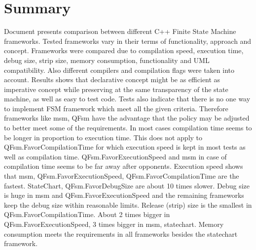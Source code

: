 \chapter{Summary}
Document presents comparison between different C++ Finite State Machine frameworks.
Tested frameworks vary in their terms of functionality, approach and concept.
Frameworks were compared due to compilation speed, execution time, debug size, strip size, memory
consumption, functionality and UML compatibility. Also different compilers and compilation flags were taken into account.
Results shows that declarative concept might be as efficient as imperative concept
while preserving at the same transparency of the state machine, as well as easy to test
code. Tests also indicate that there is no one way to implement FSM framework which meet all the
given criteria. Therefore frameworks like msm, QFsm have the advantage that the policy may be
adjusted to better meet some of the requirements.
In most cases compilation time seems to be longer in proportion to execution time.
This does not apply to QFsm.FavorCompilationTime for which execution speed is kept in most tests as well
as compilation time. QFsm.FavorExecutionSpeed and msm in case of compilation time seems to be far away after opponents.
Execution speed shows that msm, QFsm.FavorExecutionSpeed, QFsm.FavorCompilationTime are the fastest.
StateChart, QFsm.FavorDebugSize are about 10 times slower.
Debug size is huge in msm and QFsm.FavorExecutionSpeed and the remaining frameworks keep the debug size
within reasonable limits. Release (strip) size is the smallest in QFsm.FavorCompilationTime.
About 2 times bigger in QFsm.FavorExecutionSpeed, 3 times bigger in msm, statechart.
Memory consumption meets the requirements in all frameworks besides the statechart
framework.
